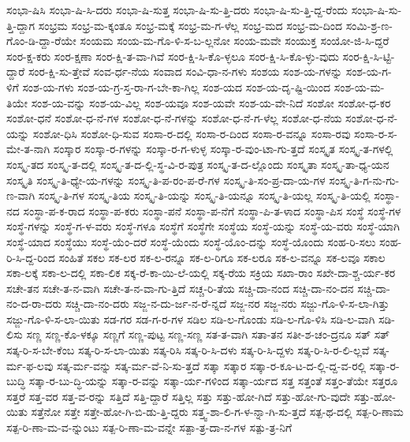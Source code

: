 {ಸಂಭಾ-ಷಿಸಿ
ಸಂಭಾ-ಷಿ-ಸಿ-ದರು
ಸಂಭಾ-ಷಿ-ಸುತ್ತ
ಸಂಭಾ-ಷಿ-ಸು-ತ್ತಿ-ದರು
ಸಂಭಾ-ಷಿ-ಸು-ತ್ತಿ-ದ್ದ-ರೆಂದು
ಸಂಭಾ-ಷಿ-ಸು-ತ್ತಿ-ದ್ದಾಗ
ಸಂಭ್ರಮ
ಸಂಭ್ರ-ಮ-ಕ್ಕಂತೂ
ಸಂಭ್ರ-ಮಕ್ಕೆ
ಸಂಭ್ರ-ಮ-ಗ-ಳೆಲ್ಲ
ಸಂಭ್ರ-ಮದ
ಸಂಭ್ರ-ಮ-ದಿಂದ
ಸಂಮಿ-ಶ್ರ-ಣ-ಗೊಂ-ಡಿ-ದ್ದಾ-ರೆಯೇ
ಸಂಯಮ
ಸಂಯ-ಮ-ಗೊ-ಳಿ-ಸ-ಬ-ಲ್ಲನೋ
ಸಂಯ-ಮವೇ
ಸಂಯುಕ್ತ
ಸಂಯೋ-ಜಿ-ಸಿ-ದ್ದರೆ
ಸಂರ-ಕ್ಷ-ಕರು
ಸಂರ-ಕ್ಷಣಾ
ಸಂರ-ಕ್ಷಿ-ತ-ವಾ-ಗಿವೆ
ಸಂರ-ಕ್ಷಿ-ಸಿ-ಕೊ-ಳ್ಳಲೂ
ಸಂರ-ಕ್ಷಿ-ಸಿ-ಕೊ-ಳ್ಳು-ವುದು
ಸಂರ-ಕ್ಷಿ-ಸಿ-ಟ್ಟಿ-ದ್ದಾರೆ
ಸಂರ-ಕ್ಷಿ-ಸು-ತ್ತೇವೆ
ಸಂವ-ರ್ಧ-ನೆಯ
ಸಂವಾದ
ಸಂವಿ-ಧಾ-ನ-ಗಳು
ಸಂಶಯ
ಸಂಶ-ಯ-ಗಳನ್ನು
ಸಂಶ-ಯ-ಗ-ಳಿಗೆ
ಸಂಶ-ಯ-ಗಳು
ಸಂಶ-ಯ-ಗ್ರ-ಸ್ತ-ರಾ-ಗ-ಬೇ-ಕಾ-ಗಿಲ್ಲ
ಸಂಶ-ಯದ
ಸಂಶ-ಯ-ದೃ-ಷ್ಟಿ-ಯಿಂದ
ಸಂಶ-ಯ-ಮ-ತಿಯೇ
ಸಂಶ-ಯ-ವನ್ನು
ಸಂಶ-ಯ-ವಿಲ್ಲ
ಸಂಶ-ಯವೂ
ಸಂಶ-ಯವೇ
ಸಂಶ-ಯ-ವೇ-ನಿದೆ
ಸಂಶೋ
ಸಂಶೋ-ಧ-ಕರ
ಸಂಶೋ-ಧನೆ
ಸಂಶೋ-ಧ-ನೆ-ಗಳ
ಸಂಶೋ-ಧ-ನೆ-ಗಳನ್ನು
ಸಂಶೋ-ಧ-ನೆ-ಗ-ಳೆಲ್ಲ
ಸಂಶೋ-ಧ-ನೆಯ
ಸಂಶೋ-ಧ-ನೆ-ಯನ್ನು
ಸಂಶೋ-ಧಿಸಿ
ಸಂಶೋ-ಧಿ-ಸುವ
ಸಂಸಾ-ರ-ದಲ್ಲಿ
ಸಂಸಾ-ರ-ದಿಂದ
ಸಂಸಾ-ರ-ವನ್ನೂ
ಸಂಸಾ-ರವು
ಸಂಸಾ-ರ-ಸ-ಮೇ-ತ-ನಾಗಿ
ಸಂಸ್ಕಾರ
ಸಂಸ್ಕಾ-ರ-ಗಳನ್ನು
ಸಂಸ್ಕಾ-ರ-ಗ-ಳುಳ್ಳ
ಸಂಸ್ಕಾ-ರ-ವುಂ-ಟಾ-ಗು-ತ್ತದೆ
ಸಂಸ್ಕೃತ
ಸಂಸ್ಕೃ-ತ-ಗಳಲ್ಲಿ
ಸಂಸ್ಕೃ-ತದ
ಸಂಸ್ಕೃ-ತ-ದಲ್ಲಿ
ಸಂಸ್ಕೃ-ತ-ದ-ಲ್ಲಿ-ಸ್ಥ-ವಿ-ರ-ಪುತ್ರ
ಸಂಸ್ಕೃ-ತ-ದ-ಲ್ಲೊಂದು
ಸಂಸ್ಕೃತಾ
ಸಂಸ್ಕೃ-ತಾ-ಧ್ಯ-ಯನ
ಸಂಸ್ಕೃತಿ
ಸಂಸ್ಕೃ-ತಿ-ಧ್ಯೇ-ಯ-ಗಳನ್ನು
ಸಂಸ್ಕೃ-ತಿ-ಪ-ರಂ-ಪ-ರೆ-ಗಳ
ಸಂಸ್ಕೃ-ತಿ-ಸಂ-ಪ್ರ-ದಾ-ಯ-ಗಳ
ಸಂಸ್ಕೃ-ತಿ-ಗ-ನು-ಗು-ಣ-ವಾಗಿ
ಸಂಸ್ಕೃ-ತಿ-ಗಳ
ಸಂಸ್ಕೃ-ತಿಯ
ಸಂಸ್ಕೃ-ತಿ-ಯನ್ನು
ಸಂಸ್ಕೃ-ತಿ-ಯನ್ನೂ
ಸಂಸ್ಕೃ-ತಿ-ಯಲ್ಲ
ಸಂಸ್ಕೃ-ತಿ-ಯಲ್ಲಿ
ಸಂಸ್ಥಾ-ನದ
ಸಂಸ್ಥಾ-ಪ-ಕ-ರಾದ
ಸಂಸ್ಥಾ-ಪ-ಕರು
ಸಂಸ್ಥಾ-ಪನೆ
ಸಂಸ್ಥಾ-ಪ-ನೆಗೆ
ಸಂಸ್ಥಾ-ಪಿ-ತ-ಳಾದ
ಸಂಸ್ಥಾ-ಪಿಸ
ಸಂಸ್ಥೆ
ಸಂಸ್ಥೆ-ಗಳ
ಸಂಸ್ಥೆ-ಗಳನ್ನು
ಸಂಸ್ಥೆ-ಗ-ಳ-ವರು
ಸಂಸ್ಥೆ-ಗಳೂ
ಸಂಸ್ಥೆಗೆ
ಸಂಸ್ಥೆಗೇ
ಸಂಸ್ಥೆಯ
ಸಂಸ್ಥೆ-ಯನ್ನು
ಸಂಸ್ಥೆ-ಯ-ವರು
ಸಂಸ್ಥೆ-ಯಾಗಿ
ಸಂಸ್ಥೆ-ಯಾದ
ಸಂಸ್ಥೆಯು
ಸಂಸ್ಥೆ-ಯೆಂ-ದರೆ
ಸಂಸ್ಥೆ-ಯೆಂದು
ಸಂಸ್ಥೆ-ಯೊಂ-ದನ್ನು
ಸಂಸ್ಥೆ-ಯೊಂದು
ಸಂಹ-ರಿ-ಸಲು
ಸಂಹ-ರಿ-ಸಿ-ದ್ದ-ರಿಂದ
ಸಂಹಿತೆ
ಸಕಲ
ಸಕ-ಲರ
ಸಕ-ಲ-ರನ್ನೂ
ಸಕ-ಲ-ರಿಗೂ
ಸಕ-ಲರೂ
ಸಕ-ಲ-ವನ್ನೂ
ಸಕ-ಲವೂ
ಸಕಾಲ
ಸಕಾ-ಲಕ್ಕೆ
ಸಕಾ-ಲ-ದಲ್ಲಿ
ಸಕಾ-ಲಿಕ
ಸಕ್ಕ-ರೆ-ಕಾ-ಯಿ-ಲೆ-ಯಲ್ಲಿ
ಸಕ್ಕ-ರೆಯ
ಸಕ್ರಿಯ
ಸಖಾ-ರಾಂ
ಸಖೇ-ದಾ-ಶ್ಚ-ರ್ಯ-ಕರ
ಸಚೇ-ತನ
ಸಚೇ-ತ-ನ-ವಾಗಿ
ಸಚೇ-ತ-ನ-ವಾ-ಗು-ತ್ತಿದೆ
ಸಚ್ಚ-ರಿ-ತೆಯ
ಸಚ್ಚಿ-ದಾ-ನಂದ
ಸಚ್ಚಿ-ದಾ-ನಂ-ದನ
ಸಚ್ಚಿ-ದಾ-ನಂ-ದ-ರಾ-ದರು
ಸಚ್ಚಿ-ದಾ-ನಂ-ದರು
ಸಜ್ಜ-ನ-ದು-ರ್ಜ-ನ-ರೆ-ನ್ನದೆ
ಸಜ್ಜ-ನರ
ಸಜ್ಜ-ನರು
ಸಜ್ಜು-ಗೊ-ಳಿ-ಸ-ಲಾ-ಗಿತ್ತು
ಸಜ್ಜು-ಗೊ-ಳಿ-ಸ-ಲಾ-ಯಿತು
ಸಡ-ಗರ
ಸಡ-ಗ-ರ-ಗಳ
ಸಡಿಲ
ಸಡಿ-ಲ-ಗೊಂಡು
ಸಡಿ-ಲ-ಗೊ-ಳಿಸಿ
ಸಡಿ-ಲ-ವಾಗಿ
ಸಡಿ-ಲಿಸು
ಸಣ್ಣ
ಸಣ್ಣ-ಕೊ-ಳಕ್ಕೂ
ಸಣ್ಣಗೆ
ಸಣ್ಣ-ಪುಟ್ಟ
ಸಣ್ಣ-ಸಣ್ಣ
ಸತ-ತ-ವಾಗಿ
ಸತಾ-ತನ
ಸತೀ-ಶ-ಚಂ-ದ್ರನೂ
ಸತ್
ಸತ್
ಸತ್ಕ-ರಿ-ಸ-ಬೇ-ಕೆಂಬ
ಸತ್ಕ-ರಿ-ಸ-ಲಾ-ಯಿತು
ಸತ್ಕ-ರಿಸಿ
ಸತ್ಕ-ರಿ-ಸಿ-ದಳು
ಸತ್ಕ-ರಿ-ಸಿ-ದ್ದಳು
ಸತ್ಕ-ರಿ-ಸಿ-ರ-ಲಿ-ಲ್ಲವೆ
ಸತ್ಕ-ರ್ಮ-ಫ-ಲವು
ಸತ್ಕ-ರ್ಮ-ವನ್ನು
ಸತ್ಕ-ರ್ಮ-ವೆ-ನಿ-ಸು-ತ್ತದೆ
ಸತ್ಕಾ
ಸತ್ಕಾರ
ಸತ್ಕಾ-ರ-ಕೂ-ಟ-ದ-ಲ್ಲಿ-ದ್ದ-ವ-ರಲ್ಲಿ
ಸತ್ಕಾ-ರ-ಬುದ್ಧಿ
ಸತ್ಕಾ-ರ-ಬು-ದ್ಧಿ-ಯನ್ನು
ಸತ್ಕಾ-ರ-ವನ್ನು
ಸತ್ಕಾ-ರ್ಯ-ಗಳಿಂದ
ಸತ್ಕಾ-ರ್ಯದ
ಸತ್ತ
ಸತ್ತಂತೆ
ಸತ್ತಂ-ತೆಯೇ
ಸತ್ತರೂ
ಸತ್ತರೆ
ಸತ್ತ-ವರ
ಸತ್ತ-ವ-ರನ್ನು
ಸತ್ತಿದೆ
ಸತ್ತಿ-ದ್ದಾರೆ
ಸತ್ತಿಲ್ಲ
ಸತ್ತು
ಸತ್ತು-ಹೋ-ಗಿದೆ
ಸತ್ತು-ಹೋ-ಗು-ವುದೇ
ಸತ್ತು-ಹೋ-ಯಿತು
ಸತ್ತೆನೋ
ಸತ್ತೇ
ಸತ್ತೇ-ಹೋ-ಗಿ-ಬಿ-ಡು-ತ್ತಿ-ದ್ದರು
ಸತ್ತ್ವ-ಶಾ-ಲಿ-ಗ-ಳ-ನ್ನಾ-ಗಿ-ಸು-ತ್ತದೆ
ಸತ್ಪ-ಥ-ದಲ್ಲಿ
ಸತ್ಪ-ರಿ-ಣಾಮ
ಸತ್ಪ-ರಿ-ಣಾ-ಮ-ವ-ನ್ನುಂಟು
ಸತ್ಪ-ರಿ-ಣಾ-ಮ-ವನ್ನೇ
ಸತ್ಪಾ-ತ್ರ-ದಾ-ನ-ಗಳ
ಸತ್ಪು-ತ್ರ-ನಿಗೆ
}
